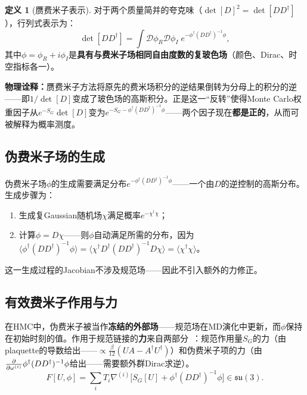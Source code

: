 \documentclass[12pt,a4paper]{ctexart}
\theoremstyle{definition}
\newtheorem{definition}{定义}[section]
\begin{document}
\begin{definition}[赝费米子表示]
对于两个质量简并的夸克味（$\det[D]^2 = \det[DD^\dagger]$），行列式表示为：
\begin{equation}
\boxed{\det[DD^\dagger] = \int \mathcal{D}\phi_R \mathcal{D}\phi_I \; e^{-\phi^\dagger (DD^\dagger)^{-1} \phi}},
\label{eq:pseudofermion}
\end{equation}
其中$\phi = \phi_R + i\phi_I$是\textbf{具有与费米子场相同自由度数的复玻色场}（颜色、Dirac、时空指标各一）。
\end{definition}

\textbf{物理诠释：}赝费米子方法将原先的费米场积分的逆结果倒转为分母上的积分的逆——即$1/\det[D]$变成了玻色场的高斯积分。正是这一``反转''使得Monte Carlo权重因子从$e^{-S_G}\det[D]$变为$e^{-S_G - \phi^\dagger(DD^\dagger)^{-1}\phi}$——两个因子现在\textbf{都是正的}，从而可被解释为概率测度。

\subsection{伪费米子场的生成}

伪费米子场$\phi$的生成需要满足分布$e^{-\phi^\dagger (DD^\dagger)^{-1} \phi}$——一个由$D$的逆控制的高斯分布。生成步骤为：
\begin{enumerate}[nosep]
    \item 生成复Gaussian随机场$\chi$满足概率$e^{-\chi^\dagger \chi}$；
    \item 计算$\phi = D \chi$——则$\phi$自动满足所需的分布，因为$\langle \phi^\dagger (DD^\dagger)^{-1} \phi \rangle = \langle \chi^\dagger D^\dagger (DD^\dagger)^{-1} D \chi \rangle = \langle \chi^\dagger \chi \rangle$。
\end{enumerate}
这一生成过程的Jacobian不涉及规范场——因此不引入额外的力修正。

\subsection{有效费米子作用与力}

在HMC中，伪费米子被当作\textbf{冻结的外部场}——规范场在MD演化中更新，而$\phi$保持在初始时刻的值。作用于规范链接的\textbf{力}来自两部分~\cite{GattringerLang2010}：规范作用量$S_G$的力（由plaquette的导数给出——$\propto \frac{\beta}{12}(UA - A^\dagger U^\dagger)$）和伪费米子项的力（由$\pdv{}{\omega^{(i)}} \phi^\dagger (DD^\dagger)^{-1} \phi$给出——需要额外群Dirac求逆）。
\begin{equation}
F[U,\phi] = \sum_i T_i \nabla^{(i)} \big[ S_G[U] + \phi^\dagger (DD^\dagger)^{-1} \phi \big] \in \mathfrak{su}(3).
\label{eq:force}
\end{equation}
\end{document}
